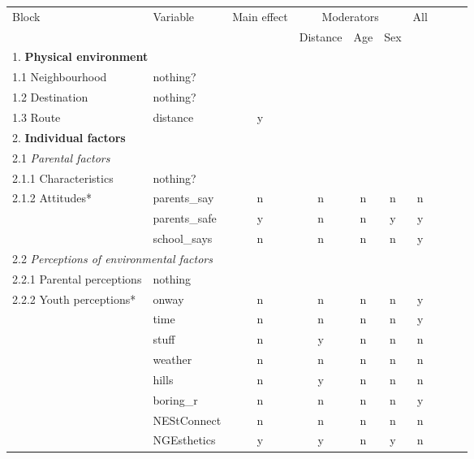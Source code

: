 \documentclass[a4paper]{article}
\begin{document}
\begin{center}
\renewcommand\arraystretch{0.9}
\small
\begin{tabular}{llcccccccc}
\toprule
Block                     & Variable & Main effect & \multicolumn{3}{c}{Moderators} & All\\
\cmidrule(r){4-6}
                          &             &     & Distance & Age & Sex  &     \\
\midrule
\multicolumn{2}{l}{1. \textbf{Physical environment} }   \\
1.1 Neighbourhood         & nothing?      &     &     &     &     &     \\
1.2 Destination           & nothing?      &     &     &     &     &     \\
1.3 Route                 & distance      &  y  &     &     &     &     \\
2. \textbf{Individual factors} \\
\multicolumn{2}{l}{2.1  \textit{Parental factors}}   \\
2.1.1 Characteristics     & nothing?      &     &     &     &     &     \\
2.1.2 Attitudes*          & parents\_say  &  n  &  n  &  n  &  n  &  n  \\
                          & parents\_safe &  y  &  n  &  n  &  y  &  y  \\
                          & school\_says  &  n  &  n  &  n  &  n  &  y  \\
\multicolumn{2}{l}{2.2 \textit{Perceptions of environmental factors}} \\
2.2.1 Parental perceptions& nothing \\
2.2.2  Youth perceptions* & onway         &  n  &  n  &  n  &  n  &  y  \\
                          & time          &  n  &  n  &  n  &  n  &  y  \\
                          & stuff         &  n  &  y  &  n  &  n  &  n  \\
                          & weather       &  n  &  n  &  n  &  n  &  n  \\
                          & hills         &  n  &  y  &  n  &  n  &  n  \\
                          & boring\_r     &  n  &  n  &  n  &  n  &  y  \\
                          & NEStConnect   &  n  &  n  &  n  &  n  &  n  \\
                          & NGEsthetics   &  y  &  y  &  n  &  y  &  n  \\

\end{tabular}
\end{center}
\end{document}
